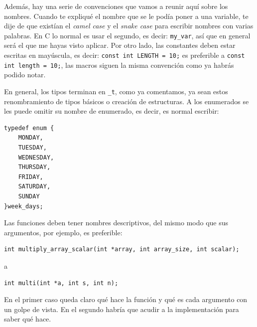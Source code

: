 \documentclass[a4paper]{article}
\begin{document}
Además, hay una serie de convenciones que vamos a reunir aquí sobre los nombres.
Cuando te expliqué el nombre que se le podía poner a una variable, te dije de
que existían el \textit{camel case} y el \textit{snake case} para escribir
nombres con varias palabras. En C lo normal es usar el segundo, es decir:
\verb!my_var!, así que en general será el que me hayas visto aplicar. Por otro
lado, las constantes deben estar escritas en mayúscula, es decir:
\lstinline[style=C]!const int LENGTH = 10;! es preferible a
\lstinline[style=C]!const int length = 10;!, las macros siguen la misma
convención como ya habrás podido notar.

En general, los tipos terminan en \verb!_t!, como ya comentamos, ya sean estos
renombramiento de tipos básicos o creación de estructuras. A los enumerados
se les puede omitir su nombre de enumerado, es decir, es normal escribir:

\noindent
\begin{minipage}[H]{\linewidth}
\mbox{}
\begin{lstlisting}[style=C,
caption={Ejemplo de tipo enumerado con typedef},
label={lst:typedefEnum}]
typedef enum {
    MONDAY,
    TUESDAY,
    WEDNESDAY,
    THURSDAY,
    FRIDAY,
    SATURDAY,
    SUNDAY
}week_days;
\end{lstlisting}
\end{minipage}

Las funciones deben tener nombres descriptivos, del mismo modo que sus argumentos,
por ejemplo, es preferible:

\noindent
\begin{minipage}[H]{\linewidth}
\mbox{}
\begin{lstlisting}[style=C,
caption={Ejemplo de función descriptiva},
label={lst:descriptiveFunction}]
int multiply_array_scalar(int *array, int array_size, int scalar);
\end{lstlisting}
\end{minipage}

a

\noindent
\begin{minipage}[H]{\linewidth}
\mbox{}
\begin{lstlisting}[style=C,
caption={Ejemplo de función no descriptiva},
label={lst:nonDescriptiveFunction}]
int multi(int *a, int s, int n);
\end{lstlisting}
\end{minipage}

En el primer caso queda claro qué hace la función y qué es cada argumento
con un golpe de vista. En el segundo habría que acudir a la implementación
para saber qué hace.
\end{document}
